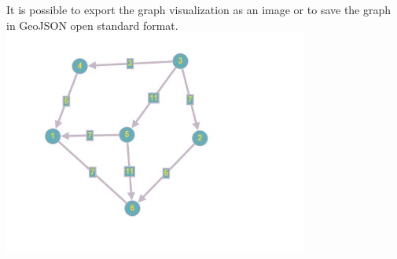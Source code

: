 It is possible to export the graph visualization as an image or to save the graph in GeoJSON\cite{rfc7946} open standard format.
\includegraphics[width=10cm]{pics/graphen.JPG}
